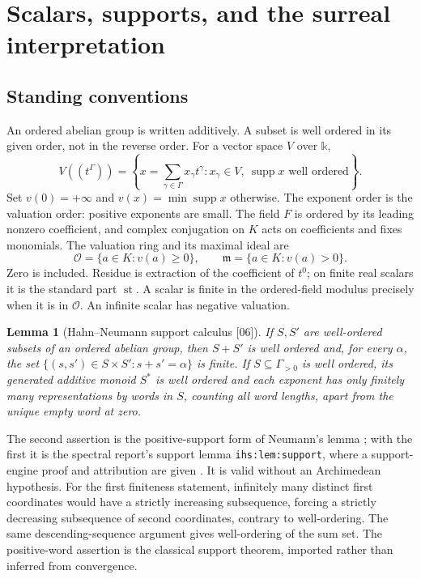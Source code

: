 \documentclass[11pt,letterpaper]{article}
\numberwithin{equation}{section}
\newtheorem{lemma}[lemma]{Lemma}
\theoremstyle{definition}
\theoremstyle{remark}
\newcommand{\kk}{\mathbb k}
\newcommand{\F}{F}
\newcommand{\K}{K}
\newcommand{\OO}{\mathcal O}
\newcommand{\mm}{\mathfrak m}
\newcommand{\supp}{\operatorname{supp}}
\newcommand{\st}{\operatorname{st}}
\newcommand{\src}[1]{\textup{\textsf{\small[#1]}}}
\newcommand{\replabel}[1]{\nolinkurl{#1}}
\begin{document}
\section{Scalars, supports, and the surreal interpretation}
\label{hgeo:sec:scalars}

\subsection{Standing conventions}
An ordered abelian group is written additively. A subset is well ordered
in its given order, not in the reverse order. For a vector space $V$ over
$\kk$,
\[
 V((t^\Gamma))=
 \left\{x=\sum_{\gamma\in\Gamma}x_\gamma t^\gamma:
 x_\gamma\in V,\ \supp x\text{ well ordered}\right\}.
\]
Set $v(0)=+\infty$ and $v(x)=\min\supp x$ otherwise. The exponent order is
the valuation order: positive exponents are small. The field $\F$ is
ordered by its leading nonzero coefficient, and complex conjugation on $\K$
acts on coefficients and fixes monomials. The valuation ring and its maximal
ideal are
\[
 \OO=\{a\in\K:v(a)\ge0\},\qquad
 \mm=\{a\in\K:v(a)>0\}.
\]
Zero is included. Residue is extraction of the coefficient of $t^0$; on
finite real scalars it is the standard part $\st$. A scalar is finite in the
ordered-field modulus precisely when it is in $\OO$. An infinite scalar has
negative valuation.

\begin{lemma}[Hahn--Neumann support calculus \src{06}]\label{hgeo:lem:support}
If $S,S'$ are well-ordered subsets of an ordered abelian group, then $S+S'$
is well ordered and, for every $\alpha$, the set
$\{(s,s')\in S\times S':s+s'=\alpha\}$ is finite. If $S\subseteq\Gamma_{>0}$
is well ordered, its generated additive monoid $S^*$ is well ordered and each
exponent has only finitely many representations by words in $S$, counting
all word lengths, apart from the unique empty word at zero.
\end{lemma}

The second assertion is the positive-support form of Neumann's lemma
\cite{Neumann}; with the first it is the spectral report's support lemma
\replabel{ihs:lem:support}, where a support-engine proof and attribution are
given \cite{RepoSpectral}. It is valid without an Archimedean hypothesis.
For the first finiteness statement, infinitely many distinct first
coordinates would have a strictly increasing subsequence, forcing a strictly
decreasing subsequence of second coordinates, contrary to well-ordering. The
same descending-sequence argument gives well-ordering of the sum set. The
positive-word assertion is the classical support theorem, imported rather
than inferred from convergence.
\end{document}
